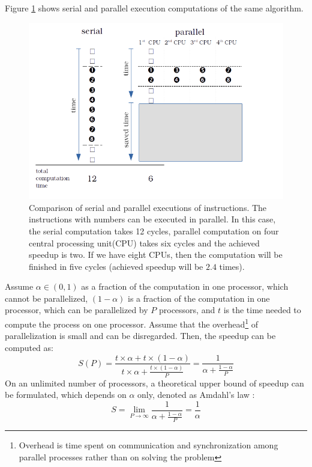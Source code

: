 Figure \ref{fig:serialvsparallel} shows serial and parallel execution computations of the same algorithm.

\begin{figure}[ht]
    \centering
    \includegraphics[width=1\textwidth]{serialvsparallel.png}
    \caption{Comparison of serial and parallel executions of instructions. The instructions with numbers can be executed in parallel. In this case, the serial computation takes 12 cycles, parallel computation on four central processing unit(CPU) takes six cycles and the achieved speedup is two. If we have eight CPUs, then the computation will be finished in five cycles (achieved speedup will be $2.4$ times).}
    \label{fig:serialvsparallel}
\end{figure}

Assume $\alpha \in (0,1)$ as a fraction of the computation in one processor, which cannot be parallelized, $(1-\alpha)$ is a fraction of the computation in one processor, which can be parallelized by $P$ processors, and $t$ is the time needed to compute the process on one processor. Assume that the overhead\footnote{Overhead is time spent on communication and synchronization among parallel processes rather than on solving the problem} of parallelization is small and can be disregarded. Then, the speedup can be computed as:
\begin{equation}\label{eq:speedup2}
 S(P) = \frac{t\times\alpha+t\times(1-\alpha)}{t \times \alpha + \frac{t \times (1-\alpha)}{P} } = \frac{1}{\alpha +\frac{1-\alpha}{P}}
 \end{equation}
On an unlimited number of processors, a theoretical upper bound of speedup can be formulated, which depends on $\alpha$ only, denoted as Amdahl's law \cite{Amdahl1967}:
\begin{equation} \label{eq:amdahl}
S = \lim_{P \to \infty} \frac{1}{\alpha +\frac{1-\alpha}{P}} = \frac{1}{\alpha}
\end{equation}

